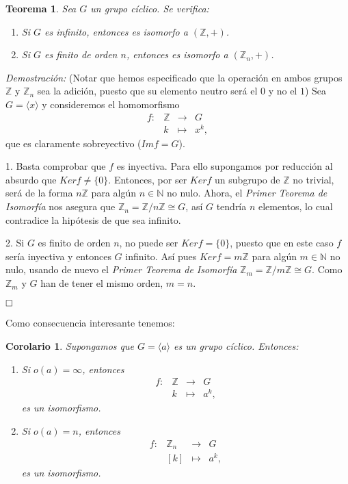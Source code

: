\documentclass[12pt]{article}
\newtheorem{theorem}{Teorema}[section]
\newtheorem{corolario}{Corolario}[theorem]
\begin{document}
\begin{theorem}
Sea $G$ un grupo cíclico. Se verifica:
\begin{enumerate}
\item Si $G$ es infinito, entonces es isomorfo a $(\mathbb{Z},+)$.
\item Si $G$ es finito de orden $n$, entonces es isomorfo a $(\mathbb{Z}_{n},+)$.
\end{enumerate}
\end{theorem}
\emph{Demostración: }(Notar que hemos especificado que la operación en ambos grupos $\mathbb{Z}$ y $\mathbb{Z}_{n}$ sea la adición, puesto que su elemento neutro será el $0$ y no el $1$)
Sea $G = \langle x \rangle$ y consideremos el homomorfismo $$\begin{array}{rccl}
f\colon &\mathbb{Z}& \longrightarrow &G\\
&k& \longmapsto &x^{k},
\end{array}
$$ que es claramente sobreyectivo ($Im f = G$).

1. Basta comprobar que $f$ es inyectiva. Para ello supongamos por reducción al absurdo que $Ker f \neq \lbrace 0\rbrace$. Entonces, por ser $Ker f$ un subgrupo de $\mathbb{Z}$ no trivial, será de la forma $n\mathbb{Z}$ para algún $n \in \mathbb{N}$ no nulo. Ahora, el \textit{Primer Teorema de Isomorfía} nos asegura que $\mathbb{Z}_{n} = \mathbb{Z}/n\mathbb{Z} \cong G$, así $G$ tendría $n$ elementos, lo cual contradice la hipótesis de que sea infinito.

2. Si $G$ es finito de orden $n$, no puede ser $Ker f = \lbrace 0 \rbrace$, puesto que en este caso $f$ sería  inyectiva y entonces $G$ infinito. Así pues $Ker f = m\mathbb{Z}$ para algún $m \in \mathbb{N}$ no nulo, usando de nuevo el \textit{Primer Teorema de Isomorfía} $\mathbb{Z}_{m} = \mathbb{Z}/m\mathbb{Z} \cong G$. Como $\mathbb{Z}_{m}$ y $G$ han de tener el mismo orden, $m=n$.

$\hfill \square$

Como consecuencia interesante tenemos:

\begin{corolario}
Supongamos que $G = \langle a \rangle$ es un grupo cíclico. Entonces:
\begin{enumerate}
\item Si $o(a) = \infty$, entonces $$\begin{array}{rccl}
f\colon &\mathbb{Z}& \longrightarrow &G\\
&k& \longmapsto &a^{k},
\end{array}
$$ es un isomorfismo.
\item Si $o(a)= n$, entonces $$\begin{array}{rccl}
f\colon &\mathbb{Z}_{n}& \longrightarrow &G\\
&\left[ k \right]& \longmapsto &a^{k},
\end{array}
$$ es un isomorfismo.
\end{enumerate} 
\end{corolario}
\end{document}
